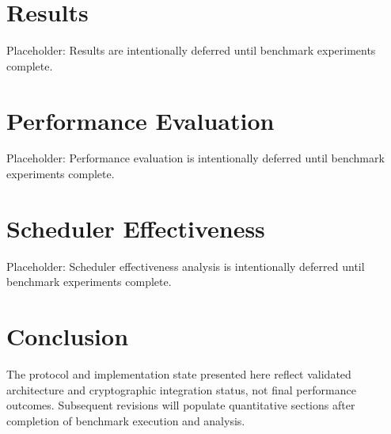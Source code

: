 \documentclass[conference]{IEEEtran}
\begin{document}
\section{Results}
Placeholder: Results are intentionally deferred until benchmark experiments complete.

\section{Performance Evaluation}
Placeholder: Performance evaluation is intentionally deferred until benchmark experiments complete.

\section{Scheduler Effectiveness}
Placeholder: Scheduler effectiveness analysis is intentionally deferred until benchmark experiments complete.

\section{Conclusion}
The protocol and implementation state presented here reflect validated architecture and cryptographic integration status, not final performance outcomes. Subsequent revisions will populate quantitative sections after completion of benchmark execution and analysis.
\end{document}
